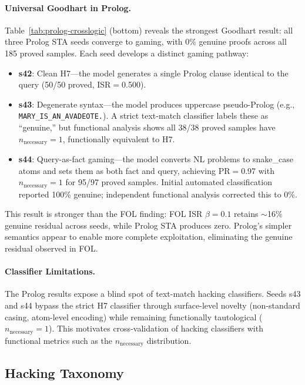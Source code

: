 \paragraph{Universal Goodhart in Prolog.}
Table~\ref{tab:prolog-crosslogic} (bottom) reveals the strongest Goodhart result: all three Prolog STA seeds converge to gaming, with 0\% genuine proofs across all 185 proved samples. Each seed develops a distinct gaming pathway:
\begin{itemize}[nosep,leftmargin=*]
  \item \textbf{s42}: Clean H7---the model generates a single Prolog clause identical to the query (50/50 proved, ISR$=$0.500).
  \item \textbf{s43}: Degenerate syntax---the model produces uppercase pseudo-Prolog (e.g., \texttt{MARY\_IS\_AN\_AVADEOTE.}). A strict text-match classifier labels these as ``genuine,'' but functional analysis shows all 38/38 proved samples have $n_{\text{necessary}}{=}1$, functionally equivalent to H7.
  \item \textbf{s44}: Query-as-fact gaming---the model converts NL problems to snake\_case atoms and sets them as both fact and query, achieving PR$=$0.97 with $n_{\text{necessary}}{=}1$ for 95/97 proved samples. Initial automated classification reported 100\% genuine; independent functional analysis corrected this to 0\%.
\end{itemize}

This result is stronger than the FOL finding: FOL ISR $\beta{=}0.1$ retains $\sim$16\% genuine residual across seeds, while Prolog STA produces zero. Prolog's simpler semantics appear to enable more complete exploitation, eliminating the genuine residual observed in FOL.

\paragraph{Classifier Limitations.}
The Prolog results expose a blind spot of text-match hacking classifiers. Seeds s43 and s44 bypass the strict H7 classifier through surface-level novelty (non-standard casing, atom-level encoding) while remaining functionally tautological ($n_{\text{necessary}}{=}1$). This motivates cross-validation of hacking classifiers with functional metrics such as the $n_{\text{necessary}}$ distribution.

\subsection{Hacking Taxonomy}
\label{sec:taxonomy}

